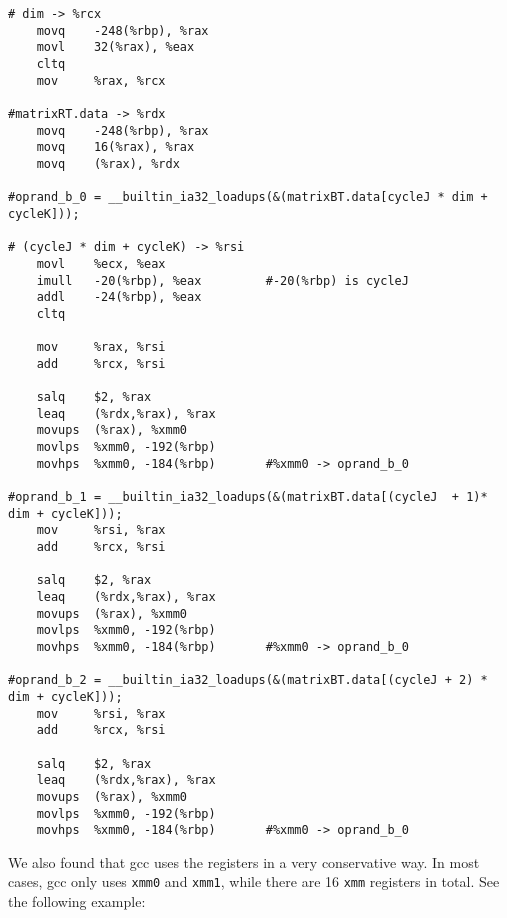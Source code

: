\documentclass[12pt]{article}
\begin{document}
\scriptsize
\begin{verbatim}
# dim -> %rcx
	movq	-248(%rbp), %rax
	movl	32(%rax), %eax
	cltq
	mov     %rax, %rcx
  
#matrixRT.data -> %rdx
	movq	-248(%rbp), %rax
	movq	16(%rax), %rax
	movq	(%rax), %rdx

#oprand_b_0 = __builtin_ia32_loadups(&(matrixBT.data[cycleJ * dim + cycleK]));
        
# (cycleJ * dim + cycleK) -> %rsi
	movl    %ecx, %eax
	imull	-20(%rbp), %eax         #-20(%rbp) is cycleJ
	addl	-24(%rbp), %eax
	cltq
        
	mov     %rax, %rsi
	add     %rcx, %rsi
	
	salq	$2, %rax
	leaq	(%rdx,%rax), %rax
	movups	(%rax), %xmm0
	movlps	%xmm0, -192(%rbp)
	movhps	%xmm0, -184(%rbp)       #%xmm0 -> oprand_b_0

#oprand_b_1 = __builtin_ia32_loadups(&(matrixBT.data[(cycleJ  + 1)* dim + cycleK]));
	mov     %rsi, %rax
	add     %rcx, %rsi

	salq	$2, %rax
	leaq	(%rdx,%rax), %rax
	movups	(%rax), %xmm0
	movlps	%xmm0, -192(%rbp)
	movhps	%xmm0, -184(%rbp)       #%xmm0 -> oprand_b_0

#oprand_b_2 = __builtin_ia32_loadups(&(matrixBT.data[(cycleJ + 2) * dim + cycleK]));
	mov     %rsi, %rax
	add     %rcx, %rsi

	salq	$2, %rax
	leaq	(%rdx,%rax), %rax
	movups	(%rax), %xmm0
	movlps	%xmm0, -192(%rbp)
	movhps	%xmm0, -184(%rbp)       #%xmm0 -> oprand_b_0
\end{verbatim}
\normalsize

We also found that gcc uses the registers in a very conservative way.
In most cases, gcc only uses \texttt{xmm0} and \texttt{xmm1}, while
there are 16 \texttt{xmm} registers in total. See the following example:
\end{document}
